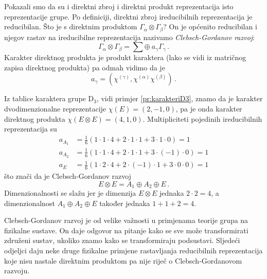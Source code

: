 Pokazali smo da su i direktni zbroj i direktni produkt reprezentacija
isto reprezentacije grupe. Po definiciji, direktni zbroj ireducibilnih
reprezentacija je reducibilan.
Što je s direktnim produktom  $\Gamma_{\alpha} \otimes \Gamma_{\beta}$?
On je općenito reducibilan i njegov rastav na ireducibilne reprezentacija
nazivamo \emph{Clebsch-Gordanov razvoj}:
\begin{displaymath}
  \Gamma_{\alpha}\otimes\Gamma_{\beta} =
  \sum \oplus\: a_{\gamma}\Gamma_{\gamma}  \,.
\end{displaymath}
Karakter direktnog produkta je produkt karaktera (lako se vidi iz
matričnog zapisa direktnog produkta) pa odmah vidimo da je
\begin{displaymath}
a_{\gamma}  = (\chi^{(\gamma)}, \chi^{(\alpha)}\chi^{(\beta)}) \,.
\end{displaymath}

\begin{primjer}
Iz tablice karaktera grupe D$_3$, vidi primjer \ref{pr:karakteriD3}, znamo
da je karakter dvodimenzionalne reprezentacije $\chi(E)=(2, -1, 0)$,
pa je onda karakter direktnog produkta
$ \chi(E\otimes E)=(4, 1, 0)$.
Multipliciteti pojedinih ireducibilnih reprezentacija su
\begin{align*}
    a_{A_1}& =\frac{1}{6}(1\cdot 1\cdot 4+2\cdot 1\cdot 1+3\cdot 1\cdot 0)=1 \\
    a_{A_2}& =\frac{1}{6}(1\cdot 1\cdot 4+2\cdot 1\cdot 1+3\cdot (-1)\cdot 0)=1 \\
    a_{E}& =\frac{1}{6}(1\cdot 2\cdot 4+2\cdot (-1)\cdot 1+3\cdot 0\cdot 0)=1
\end{align*}
što znači da je Clebsch-Gordanov razvoj
\begin{equation}
E\otimes E = A_1 \oplus A_2 \oplus E  \,.
\end{equation}
Dimenzionalnosti se slažu jer je dimenzija $E\otimes E$ jednaka $2\cdot 2=4$, a dimenzionalnost
$A_1 \oplus A_2 \oplus E$ također jednaka $1+1+2=4$.
\end{primjer}

Clebsch-Gordanov razvoj je od velike važnosti u primjenama teorije
grupa na fizikalne sustave. On  daje odgovor na pitanje
kako se sve može transformirati združeni sustav, ukoliko znamo kako
se transformiraju podsustavi. Sljedeći odjeljci daju neke druge fizikalne
primjene rastavljanja reducibilnih reprezentacija koje nisu nastale
direktnim produktom pa nije riječ o Clebsch-Gordanovom razvoju.

